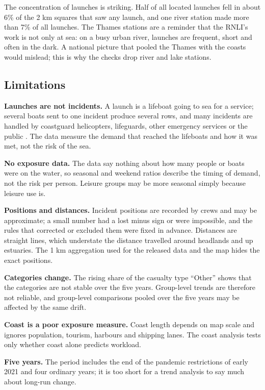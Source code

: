 \documentclass[11pt,a4paper]{article}
\begin{document}
The concentration of launches is striking. Half of all located launches fell in about 6\% of the 2 km squares that saw any launch, and one river station made more than 7\% of all launches. The Thames stations are a reminder that the RNLI's work is not only at sea: on a busy urban river, launches are frequent, short and often in the dark. A national picture that pooled the Thames with the coasts would mislead; this is why the checks drop river and lake stations.

\subsection{Limitations}
\textbf{Launches are not incidents.} A launch is a lifeboat going to sea for a service; several boats sent to one incident produce several rows, and many incidents are handled by coastguard helicopters, lifeguards, other emergency services or the public \citep{odi2021}. The data measure the demand that reached the lifeboats and how it was met, not the risk of the sea.

\textbf{No exposure data.} The data say nothing about how many people or boats were on the water, so seasonal and weekend ratios describe the timing of demand, not the risk per person. Leisure groups may be more seasonal simply because leisure use is.

\textbf{Positions and distances.} Incident positions are recorded by crews and may be approximate; a small number had a lost minus sign or were impossible, and the rules that corrected or excluded them were fixed in advance. Distances are straight lines, which understate the distance travelled around headlands and up estuaries. The 1 km aggregation used for the released data and the map hides the exact positions.

\textbf{Categories change.} The rising share of the casualty type ``Other'' shows that the categories are not stable over the five years. Group-level trends are therefore not reliable, and group-level comparisons pooled over the five years may be affected by the same drift.

\textbf{Coast is a poor exposure measure.} Coast length depends on map scale and ignores population, tourism, harbours and shipping lanes. The coast analysis tests only whether coast alone predicts workload.

\textbf{Five years.} The period includes the end of the pandemic restrictions of early 2021 and four ordinary years; it is too short for a trend analysis to say much about long-run change.
\end{document}
